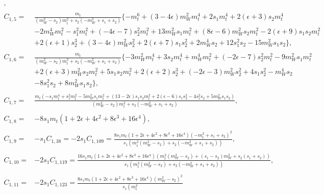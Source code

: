 \documentclass[twocolumn,aps,showpacs,nofootinbib,superscriptaddress,prd]{revtex4-2}
\begin{document}
\begin{widetext}
\begin{align}
,\nonumber\\
\nonumber\\
C_{1,5}=&\frac{m_t}{\left(m_W^2-s_2\right)m_t^2+s_2\left(-m_W^2+s_1+s_2\right)}\{-m_t^6+\left(3-4\epsilon\right)m_W^2m_t^4+2s_1m_t^4+2\left(\epsilon+3\right)s_2m_t^4
\nonumber\\&
-2m_W^4m_t^2-s_1^2m_t^2+\left(-4\epsilon-7\right)s_2^2m_t^2+13m_W^2s_1m_t^2+\left(8\epsilon-6\right)m_W^2s_2m_t^2-2\left(\epsilon+9\right)s_1s_2m_t^2
\nonumber\\&
+2\left(\epsilon+1\right)s_2^3+\left(3-4\epsilon\right)m_W^2s_2^2+2\left(\epsilon+7\right)s_1s_2^2+2m_W^4s_2+12s_1^2s_2-15m_W^2s_1s_2\}
,\nonumber\\
\nonumber\\
C_{1,6}=&\frac{m_t}{\left(m_W^2-s_2\right)m_t^2+s_2\left(-m_W^2+s_1+s_2\right)}\{-3m_W^2m_t^4+3s_2m_t^4+m_W^4m_t^2+\left(-2\epsilon-7\right)s_2^2m_t^2-9m_W^2s_1m_t^2
\nonumber\\&
+2\left(\epsilon+3\right)m_W^2s_2m_t^2+5s_1s_2m_t^2+2\left(\epsilon+2\right)s_2^3+\left(-2\epsilon-3\right)m_W^2s_2^2+4s_1s_2^2-m_W^4s_2
\nonumber\\&
-8s_1^2s_2+8m_W^2s_1s_2\}
,\nonumber\\
\nonumber\\
C_{1,7}=&\frac{m_t(-s_1m_t^4+s_1^2m_t^2-5m_W^2s_1m_t^2+(13-2\epsilon)s_1s_2m_t^2+2(\epsilon-6)s_1s_2^2-4s_1^2s_2+5m_W^2s_1s_2)}{\left(m_W^2-s_2\right)m_t^2+s_2\left(-m_W^2+s_1+s_2\right)}
,\nonumber\\
\nonumber\\
C_{1,8}=&-8s_1m_t\left(1 +2 \epsilon +4 \epsilon^2 +8 \epsilon^3 +16 \epsilon^4\right)
,\nonumber\\
\nonumber\\
C_{1,9}=&-s_1C_{1,38}=-2s_1C_{1,109}=\frac{8s_1m_t\left(1 +2 \epsilon +4 \epsilon^2 +8 \epsilon^3 +16 \epsilon^4\right)\left(-m_t^2+s_1+s_2\right)^2}{s_1\left(m_t^2
\left(m_W^2-s_2\right)+s_2\left(-m_W^2+s_1+s_2\right)\right)}
,\nonumber\\
\nonumber\\
C_{1,10}=&-2s_1C_{1,119}=\frac{16s_1m_t\left(1 +2 \epsilon +4 \epsilon^2 +8 \epsilon^3 +16 \epsilon^4\right)\left(m_t^2
\left(m_W^2-s_2\right)+\left(s_1-s_2\right)m_W^2+s_2\left(s_1+s_2\right)\right)}{s_1\left(m_t^2\left(m_W^2-s_2\right)+s_2
\left(-m_W^2+s_1+s_2\right)\right)}
,\nonumber\\
\nonumber\\
C_{1,11}=&-2s_1C_{1,123}=\frac{8s_1m_t\left(1 +2 \epsilon +4 \epsilon^2 +8 \epsilon^3 +16 \epsilon^4\right)\left(m_W^2-s_2\right)^2}{s_1\left(m_t^2
}
\end{align}
\end{widetext}
\end{document}
